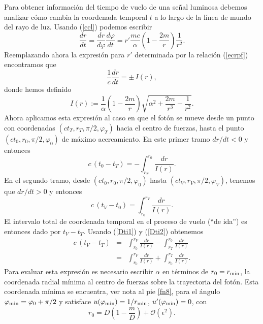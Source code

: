 Para obtener información del tiempo de vuelo de una señal luminosa debemos analizar cómo cambia la coordenada temporal $t$ a lo largo de la línea de mundo del rayo de luz.
Usando (\ref{ccl}) podemos escribir
\begin{equation}
\frac{dr}{dt}=\frac{dr}{d\varphi}\frac{d\varphi}{dt}=r'\frac{mc}{\alpha}\left(1-\frac{2m}{r}\right)\frac{1}{r^2}.
\end{equation}
Reemplazando ahora la expresión para $r'$ determinada por la relación (\ref{ecrpf}) encontramos que
\begin{equation}
\frac{1}{c}\frac{dr}{dt}=\pm\, I(r),
\end{equation}
donde hemos definido
\begin{equation}
I(r):=\frac{1}{\alpha}\left(1-\frac{2m}{r}\right)\sqrt{\alpha^2+\frac{2m}{r^3}-\frac{1}{r^2}}.
\end{equation}
Ahora aplicamos esta expresión al caso en que el fotón se mueve desde un punto con coordenadas $(ct_T,r_T,\pi/2,\varphi_T)$ hacia el centro de fuerzas, hasta el punto $(ct_0,r_0,\pi/2,\varphi_0)$ de máximo acercamiento. En este primer tramo $dr/dt<0$ y entonces
\begin{equation}\label{Dti1}
c\,(t_0-t_T)=-\int^{r_0}_{r_T}\frac{dr}{I(r)}.
\end{equation}
En el segundo tramo, desde $(ct_0,r_0,\pi/2,\varphi_0)$ hasta $(ct_V,r_V,\pi/2,\varphi_V)$, tenemos que $dr/dt>0$ y entonces
\begin{equation}\label{Dti2}
c\,(t_V-t_0)=\int_{r_0}^{r_V}\frac{dr}{I(r)}.
\end{equation}
El intervalo total de coordenada temporal en el proceso de vuelo (``de ida'') es entonces dado por $t_V-t_T$. Usando (\ref{Dti1}) y (\ref{Dti2}) obtenemos
\begin{eqnarray}
c\,(t_V-t_T)&=&\int_{r_0}^{r_V}\frac{dr}{I(r)}-\int^{r_0}_{r_T}\frac{dr}{I(r)} \\
&=&\int_{r_0}^{r_V}\frac{dr}{I(r)}+\int_{r_0}^{r_T}\frac{dr}{I(r)}. \label{cDtI}
\end{eqnarray}
Para evaluar esta expresión es necesario escribir $\alpha$ en términos de $r_0=r_{\rm min}$, la coordenada radial mínima al centro de fuerzas sobre la trayectoria del fotón. Esta coordenada mínima se encuentra, ver nota al pie \ref{fn8}, para el ángulo $\varphi_{\rm min}=\varphi_0+\pi/2$ y satisface $u(\varphi_{\rm min})=1/r_{\rm min}$, $u'(\varphi_{\rm min})=0$, con
\begin{equation}
 r_0=D\left(1-\frac{m}{D}\right)+\mathcal{O}(\epsilon^2).
\end{equation}
